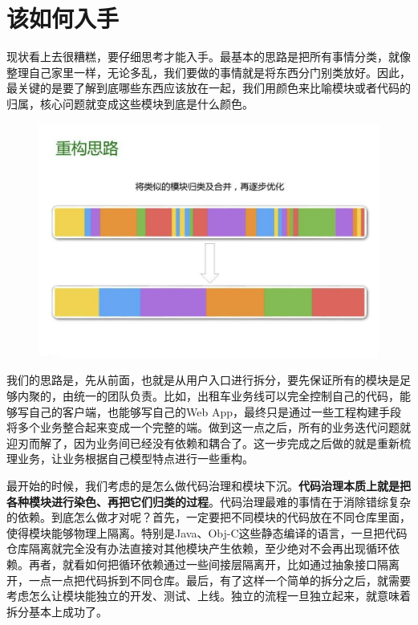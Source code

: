 \documentclass[12pt]{article}
\begin{document}
\section{该如何入手}
现状看上去很糟糕，要仔细思考才能入手。最基本的思路是把所有事情分类，就像整理自己家里一样，无论多乱，我们要做的事情就是将东西分门别类放好。因此，最关键的是要了解到底哪些东西应该放在一起，我们用颜色来比喻模块或者代码的归属，核心问题就变成这些模块到底是什么颜色。

\begin{figure}[H]
    \centering
    \includegraphics[width=1\textwidth]{fig/DIDI_Reconstruction_8.png}
\end{figure}

我们的思路是，先从前面，也就是从用户入口进行拆分，要先保证所有的模块是足够内聚的，由统一的团队负责。比如，出租车业务线可以完全控制自己的代码，能够写自己的客户端，也能够写自己的Web App，最终只是通过一些工程构建手段将多个业务整合起来变成一个完整的端。做到这一点之后，所有的业务迭代问题就迎刃而解了，因为业务间已经没有依赖和耦合了。这一步完成之后做的就是重新梳理业务，让业务根据自己模型特点进行一些重构。

最开始的时候，我们考虑的是怎么做代码治理和模块下沉。\textbf{代码治理本质上就是把各种模块进行染色、再把它们归类的过程}。代码治理最难的事情在于消除错综复杂的依赖。到底怎么做才对呢？首先，一定要把不同模块的代码放在不同仓库里面，使得模块能够物理上隔离。特别是Java、Obj-C这些静态编译的语言，一旦把代码仓库隔离就完全没有办法直接对其他模块产生依赖，至少绝对不会再出现循环依赖。再者，就看如何把循环依赖通过一些间接层隔离开，比如通过抽象接口隔离开，一点一点把代码拆到不同仓库。最后，有了这样一个简单的拆分之后，就需要考虑怎么让模块能独立的开发、测试、上线。独立的流程一旦独立起来，就意味着拆分基本上成功了。
\end{document}

